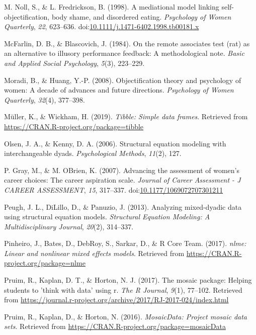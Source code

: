 \documentclass[man]{apa6}
\begin{document}
\hypertarget{ref-nollfredrickson1998}{}
M. Noll, S., \& L. Fredrickson, B. (1998). A mediational model linking
self-objectification, body shame, and disordered eating.
\emph{Psychology of Women Quarterly}, \emph{22}, 623--636.
doi:\href{https://doi.org/10.1111/j.1471-6402.1998.tb00181.x}{10.1111/j.1471-6402.1998.tb00181.x}

\hypertarget{ref-mcfarlin1984remote}{}
McFarlin, D. B., \& Blascovich, J. (1984). On the remote associates test
(rat) as an alternative to illusory performance feedback: A
methodological note. \emph{Basic and Applied Social Psychology},
\emph{5}(3), 223--229.

\hypertarget{ref-moradi2008}{}
Moradi, B., \& Huang, Y.-P. (2008). Objectification theory and
psychology of women: A decade of advances and future directions.
\emph{Psychology of Women Quarterly}, \emph{32}(4), 377--398.

\hypertarget{ref-R-tibble}{}
Müller, K., \& Wickham, H. (2019). \emph{Tibble: Simple data frames}.
Retrieved from \url{https://CRAN.R-project.org/package=tibble}

\hypertarget{ref-olsen2006structural}{}
Olsen, J. A., \& Kenny, D. A. (2006). Structural equation modeling with
interchangeable dyads. \emph{Psychological Methods}, \emph{11}(2), 127.

\hypertarget{ref-grayobrien2007}{}
P. Gray, M., \& M. OBrien, K. (2007). Advancing the assessment of
women's career choices: The career aspiration scale. \emph{Journal of
Career Assessment - J CAREER ASSESSMENT}, \emph{15}, 317--337.
doi:\href{https://doi.org/10.1177/1069072707301211}{10.1177/1069072707301211}

\hypertarget{ref-peugh2013analyzing}{}
Peugh, J. L., DiLillo, D., \& Panuzio, J. (2013). Analyzing mixed-dyadic
data using structural equation models. \emph{Structural Equation
Modeling: A Multidisciplinary Journal}, \emph{20}(2), 314--337.

\hypertarget{ref-R-nlme}{}
Pinheiro, J., Bates, D., DebRoy, S., Sarkar, D., \& R Core Team. (2017).
\emph{nlme: Linear and nonlinear mixed effects models}. Retrieved from
\url{https://CRAN.R-project.org/package=nlme}

\hypertarget{ref-R-mosaic}{}
Pruim, R., Kaplan, D. T., \& Horton, N. J. (2017). The mosaic package:
Helping students to 'think with data' using r. \emph{The R Journal},
\emph{9}(1), 77--102. Retrieved from
\url{https://journal.r-project.org/archive/2017/RJ-2017-024/index.html}

\hypertarget{ref-R-mosaicData}{}
Pruim, R., Kaplan, D., \& Horton, N. (2016). \emph{MosaicData: Project
mosaic data sets}. Retrieved from
\url{https://CRAN.R-project.org/package=mosaicData}
\end{document}
